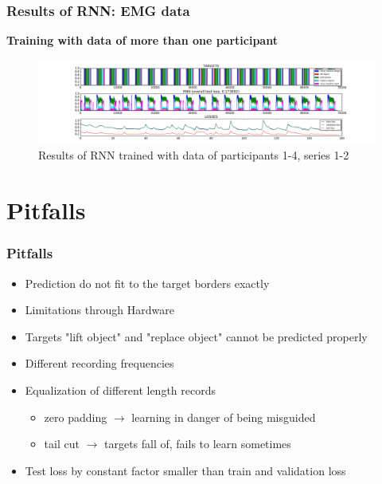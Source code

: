 \documentclass{beamer}
\begin{document}
\begin{frame}
	\frametitle{Results of RNN: EMG data}
	\textbf{Training with data of more than one participant}
	\begin{figure}[ht]
		\centering
		\includegraphics[width=1.0\textwidth,trim={5cm 0cm 5cm 0cm},clip]{images/EMG-results_participant_1-4_series1-2.png}
		\caption{Results of RNN trained with data of participants 1-4, series 1-2}

	\end{figure}
\end{frame}

\section{Pitfalls}

\begin{frame}
	\frametitle{Pitfalls}
	\begin{itemize}
		\item Prediction do not fit to the target borders exactly
		\item Limitations through Hardware
		\item Targets "lift object" and "replace object" cannot be predicted properly
        \item Different recording frequencies
        \item Equalization of different length records
        \begin{itemize}
            \item zero padding $\rightarrow$ learning in danger of being misguided
            \item tail cut $\rightarrow$ targets fall of, fails to learn sometimes
        \end{itemize}
        \item Test loss by constant factor smaller than train and validation loss
	\end{itemize}
\end{frame}

\end{document}
